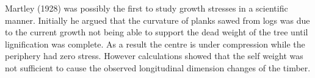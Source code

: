 Martley (1928) was possibly the first to study growth stresses in a scientific
manner. Initially he argued that the curvature of planks sawed from logs was due
to the current growth not being able to support the dead weight of the tree until
lignification was complete. As a result the centre is under compression while
the periphery had zero stress. However calculations showed that the self weight
was not sufficient to cause the observed longitudinal dimension changes of the
timber.